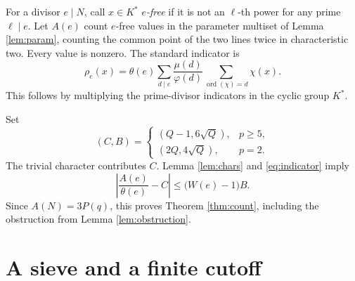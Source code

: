 \documentclass[11pt]{article}
\theoremstyle{remark}\newtheorem{remark}[theorem]{Remark}
\begin{document}
For a divisor $e\mid N$, call $x\in K^*$ \emph{$e$-free} if it is not an $\ell$-th power for any prime $\ell\mid e$. Let $A(e)$ count $e$-free values in the parameter multiset of Lemma \ref{lem:param}, counting the common point of the two lines twice in characteristic two. Every value is nonzero. The standard indicator is
\begin{equation}\label{eq:indicator}
 \rho_e(x)=\theta(e)\sum_{d\mid e}\frac{\mu(d)}{\varphi(d)}
               \sum_{\operatorname{ord}(\chi)=d}\chi(x).
\end{equation}
This follows by multiplying the prime-divisor indicators in the cyclic group $K^*$.

Set
\begin{equation}\label{eq:CB}
 (C,B)=
 \begin{cases}
 (Q-1,6\sqrt Q),&p\ge5,\\
 (2Q,4\sqrt Q),&p=2.
 \end{cases}
\end{equation}
The trivial character contributes $C$. Lemma \ref{lem:chars} and \eqref{eq:indicator} imply
\begin{equation}\label{eq:freebound}
 \left|\frac{A(e)}{\theta(e)}-C\right|\le\bigl(W(e)-1\bigr)B.
\end{equation}
Since $A(N)=3P(q)$, this proves Theorem \ref{thm:count}, including the obstruction from Lemma \ref{lem:obstruction}.

\section{A sieve and a finite cutoff}
\end{document}

